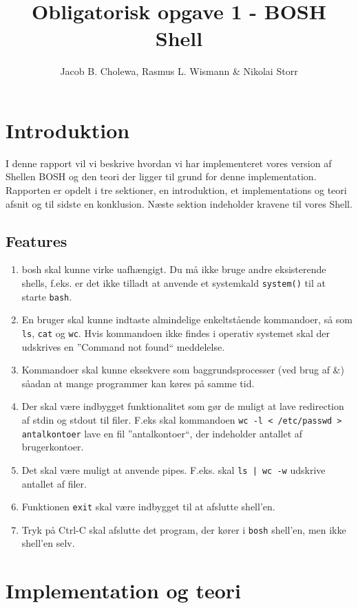 \documentclass[danish]{report}
\title{Obligatorisk opgave 1 - BOSH Shell}
\author{Jacob B. Cholewa, Rasmus L. Wismann \& Nikolai Storr }
\begin{document}
\maketitle
\newpage
\tableofcontents

\chapter{Introduktion}

I denne rapport vil vi beskrive hvordan vi har implementeret vores version af Shellen BOSH og den teori der ligger til grund for denne implementation. Rapporten er opdelt i tre sektioner, en introduktion, et implementations og teori afsnit og til sidste en konklusion. Næste sektion indeholder kravene til vores Shell.  

\section{Features}
\begin{enumerate}
\item bosh skal kunne virke uafhængigt. Du må ikke bruge andre eksisterende shells, f.eks. er det ikke tilladt at anvende et systemkald {\tt system()} til at starte {\tt bash}.
\item En bruger skal kunne indtaste almindelige enkeltstående kommandoer, så som {\tt ls}, {\tt cat} og {\tt wc}. Hvis kommandoen ikke findes i operativ systemet skal der udskrives en ”Command not found“ meddelelse.
\item Kommandoer skal kunne eksekvere som baggrundsprocesser (ved brug af \&) såadan at mange programmer kan køres på samme tid.
\item Der skal være indbygget funktionalitet som gør de muligt at lave redirection af stdin og stdout til filer. F.eks skal kommandoen {\tt wc -l < /etc/passwd > antalkontoer} lave en fil ”antalkontoer“, der indeholder antallet af brugerkontoer.
\item Det skal være muligt at anvende pipes. F.eks. skal {\tt ls | wc -w} udskrive antallet af filer.
\item Funktionen {\tt exit} skal være indbygget til at afslutte shell’en.
\item Tryk på Ctrl-C skal afslutte det program, der kører i {\tt bosh} shell’en, men ikke shell’en selv.
\end{enumerate}

\chapter{Implementation og teori}
\end{document}
